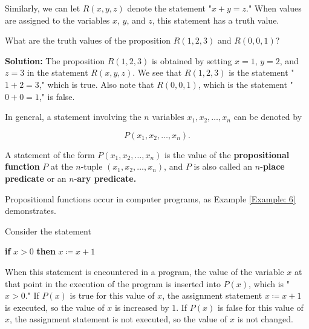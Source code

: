 \documentclass{Axon}
\begin{document}
Similarly, we can let \(R(x, y, z)\) denote the statement "\(x + y = z\)." When values are assigned to the variables \(x\), \(y\), and \(z\), this statement has a truth value.

\begin{example}
    What are the truth values of the proposition \(R(1, 2, 3)\) and \(R(0, 0, 1)\)?

    \noindent
    \textbf{Solution:}
    The proposition \(R(1, 2, 3)\) is obtained by setting \(x = 1\), \(y = 2\), and \(z = 3\) in the statement \(R(x, y, z)\). We see that \(R(1, 2, 3)\) is the statement "\(1 + 2 = 3\)," which is true. Also note that \(R(0, 0, 1)\), which is the statement "\(0 + 0 = 1\)," is false.
\end{example}

In general, a statement involving the \(n\) variables \(x_1, x_2, \ldots, x_n\) can be denoted by

\begin{equation}
    P(x_1, x_2, \ldots, x_n).
\end{equation}

A statement of the form \(P(x_1, x_2, \ldots, x_n)\) is the value of the \textbf{propositional function} \(P\) at the \(n\)-tuple \((x_1, x_2, \ldots, x_n)\), and \(P\) is also called an \(n\)-\textbf{place predicate} or an \(n\)-\textbf{ary predicate.}

Propositional functions occur in computer programs, as Example \ref{Example: 6} demonstrates.

\begin{example}\label{Example: 6}
    Consider the statement
    
    \begin{center}
        \textbf{if} \(x > 0\) \textbf{then} \(x \coloneq x + 1\)
    \end{center}

    When this statement is encountered in a program, the value of the variable \(x\) at that point in the execution of the program is inserted into \(P(x)\), which is "\(x > 0\)." If \(P(x)\) is true for this value of \(x\), the assignment statement \(x \coloneq x + 1\) is executed, so the value of \(x\) is increased by \(1\). If \(P(x)\) is false for this value of \(x\), the assignment statement is not executed, so the value of \(x\) is not changed.        
\end{example}
\end{document}
